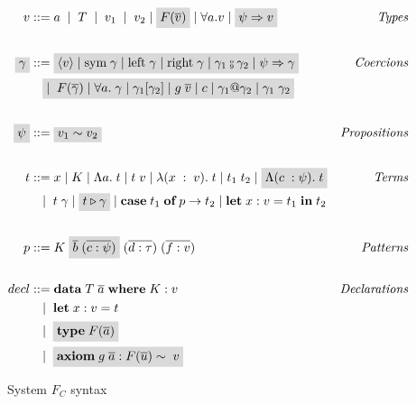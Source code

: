 \begin{figure}
\begin{align*}
    v &::= a \;  \; | \;  \; T \;  \; | \;  \; v_1 \;  \; | \;  \; v_2  \; | \;
    \highlight{F(\overline{v})}  \; | \;  \forall a. v  \; | \; \highlight{\psi
    \Rightarrow v} &\textit{Types}\\ \\
    \highlight{\gamma} &::= \highlight{\langle v \rangle \; | \; \text{sym} \; \gamma \; | \;
    \text{left} \; \gamma \; | \; \text{right} \; \gamma \; | \; \gamma_1
    \fctrans
    \gamma_2 \; | \; \psi \Rightarrow \gamma} &\textit{Coercions} \\ 
    \; &\quad \highlight{| \; \; F(\overline{\gamma}) \; | \; \forall a . \; \gamma \; | \;
    \gamma_1 [\gamma_2] \; | \; g \; \overline{v} \; | \; c \; | \; \gamma_1 @
    \gamma_2 \; | \; \gamma_1 \; \gamma_2} \\ \\
    \highlight{\psi} &::= \highlight{v_1 \sim v_2} &\textit{Propositions}\\ \\
    t &::= x \; | \; K \; | \; \Lambda a . \; t \; | \; t \; v \; | \;
    \lambda(x\; : \; v). \; t \; | \; t_1 \; t_2 \; | \; \highlight{\Lambda(c \; : \psi).
    \; t} &\textit{Terms} \\
          &\quad | \; \; t \; \gamma \; | \; \highlight{t \triangleright \gamma} \; | \;
    \textbf{case} \; t_1 \; \textbf{of} \; p \rightarrow t_2 \; | \;
    \textbf{let} \; x : v = t_1 \; \textbf{in} \; t_2 \\ \\
    p &::= K \; \highlight{\overline{b} \; (\overline{c : \psi})} \; (\overline{d : \tau})
    \; (\overline{f : v}) &\textit{Patterns}\\ \\
    decl &::= \textbf{data} \; T \; \overline{a} \; \textbf{where} \; K : v
         &\textit{Declarations}\\
         &\quad | \; \; \textbf{let} \; x : v = t \\
         &\quad | \; \; \highlight{\textbf{type} \; F(\overline{a})} \\
         &\quad | \; \; \highlight{\textbf{axiom} \; g \; \overline{a} :
         F(\overline{u}) \sim \; v} \\
\end{align*}
\caption{System $F_C$ syntax}
\label{fc-syntax}
\end{figure}

